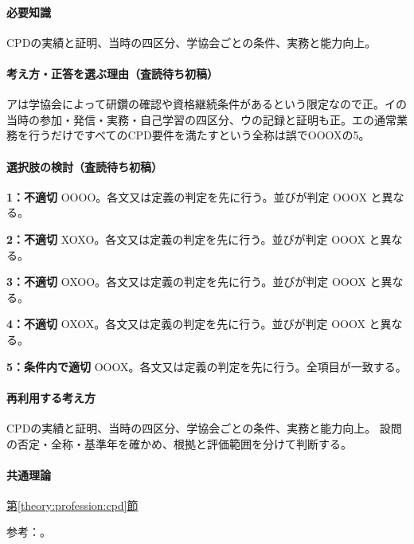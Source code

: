 \paragraph{必要知識} CPDの実績と証明、当時の四区分、学協会ごとの条件、実務と能力向上。

\paragraph{考え方・正答を選ぶ理由（査読待ち初稿）} アは学協会によって研鑽の確認や資格継続条件があるという限定なので正。イの当時の参加・発信・実務・自己学習の四区分、ウの記録と証明も正。エの通常業務を行うだけですべてのCPD要件を満たすという全称は誤でOOOXの5。

\paragraph{選択肢の検討（査読待ち初稿）}\mbox{}\par

\noindent\textbf{1：不適切} OOOO。各文又は定義の判定を先に行う。並びが判定 OOOX と異なる。\par

\noindent\textbf{2：不適切} XOXO。各文又は定義の判定を先に行う。並びが判定 OOOX と異なる。\par

\noindent\textbf{3：不適切} OXOO。各文又は定義の判定を先に行う。並びが判定 OOOX と異なる。\par

\noindent\textbf{4：不適切} OXOX。各文又は定義の判定を先に行う。並びが判定 OOOX と異なる。\par

\noindent\textbf{5：条件内で適切} OOOX。各文又は定義の判定を先に行う。全項目が一致する。\par

\paragraph{再利用する考え方} CPDの実績と証明、当時の四区分、学協会ごとの条件、実務と能力向上。 設問の否定・全称・基準年を確かめ、根拠と評価範囲を分けて判断する。

\paragraph{共通理論} \hyperref[theory:profession:cpd]{第\ref*{theory:profession:cpd}節}

\par 参考：\cite{cpd_v3,cpd_versions,cpd_new2021}。

